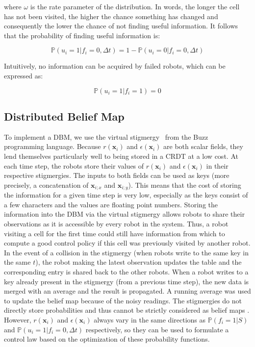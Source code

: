 \documentclass[letterpaper, 10 pt, conference]{ieeeconf}
\begin{document}
where $\omega$ is the rate parameter of the distribution. In words,
the longer the cell has not been visited, the higher the chance
something has changed and consequently the lower the chance of not
finding useful information. It follows that the probability of finding
useful information is:

\begin{equation}
    \mathbb{P}(u_i=1 | f_i=0, \Delta t) = 1 - \mathbb{P}(u_i=0 | f_i=0, \Delta t)
    \label{eq:usefulInformation}
\end{equation}

Intuitively, no information can be acquired by failed robots, which
can be expressed as:

\begin{equation}
    \mathbb{P}(u_i=1 | f_i=1) = 0
    \label{eq:informationFailure}
\end{equation}

\subsection{Distributed Belief Map}
To implement a DBM, we use the virtual
stigmergy~\cite{pinciroliTuple2016} from the
Buzz~\cite{pinciroliBuzz2016} programming language. Because
$r(\bm{x}_i)$ and $\epsilon(\bm{x}_i)$ are both scalar fields, they
lend themselves particularly well to being stored in a CRDT at a low
cost. At each time step, the robots store their values of
$r(\bm{x}_i)$ and $\epsilon(\bm{x}_i)$ in their respective
stigmergies.  The inputs to both fields can be used as keys (more
precisely, a concatenation of $\bm{x}_{i;x}$ and $\bm{x}_{i;y}$). This
means that the cost of storing the information for a given time step
is very low, especially as the keys consist of a few characters and
the values are floating point numbers. Storing the information into
the DBM via the virtual stigmergy allows robots to share their
observations as it is accessible by every robot in the system. Thus, a
robot visiting a cell for the first time could still have information from
which to compute a good control policy if this cell was previously
visited by another robot. In the event of a collision in the stigmergy
(when robots write to the same key in the same $t$), the robot making the latest observation updates the table and the corresponding entry is shared back to the other robots. When a robot writes to a key already present
in the stigmergy (from a previous time step), the new data is merged
with an average and the result is propagated. A running average was used to update the belief map because of the noisy readings. The stigmergies do not directly store probabilities
and thus cannot be strictly considered as belief maps
\cite{kobayashiSharingExploringInformation2002}.  However,
$r(\bm{x}_i)$ and $\epsilon(\bm{x}_i)$ always vary in the same
directions as $\mathbb{P}(f_i = 1 | S)$ and
$\mathbb{P}(u_i=1 | f_i=0, \Delta t)$ respectively, so they can be
used to formulate a control law based on the optimization of these
probability functions.
\end{document}
